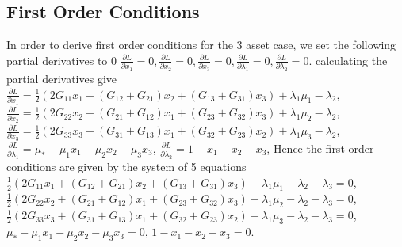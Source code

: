 \documentclass[11pt]{article}
\begin{document}
\subsection{First Order Conditions}
In order to derive first order conditions for the 3 asset case, we set the following partial derivatives to 0
\newline $\frac{\partial L}{\partial x_{1}}=0,  \frac{\partial L}{\partial x_{2}}=0, \frac{\partial L}{\partial x_{3}}=0, \frac{\partial L}{\partial \lambda_{1}}=0 , \frac{\partial L}{\partial \lambda_{2}}=0$.
\newline calculating the partial derivatives give
\newline  $\frac{\partial L}{\partial x_{1}}=\frac{1}{2}\left(2G_{11}x_1+\left(G_{12}+G_{21}\right)x_{2}+\left(G_{13}+G_{31}\right)x_{3}\right)+\lambda_1\mu_1-\lambda_2$,
\newline  $\frac{\partial L}{\partial x_{2}}=\frac{1}{2}\left(2G_{22}x_2+\left(G_{21}+G_{12}\right)x_{1}+\left(G_{23}+G_{32}\right)x_{3}\right)+\lambda_1\mu_2-\lambda_2$,
\newline  $\frac{\partial L}{\partial x_{3}}=\frac{1}{2}\left(2G_{33}x_3+\left(G_{31}+G_{13}\right)x_{1}+\left(G_{32}+G_{23}\right)x_{2}\right)+\lambda_1\mu_3-\lambda_2$,
\newline  $\frac{\partial L}{\partial \lambda_{1}}=\mu_{*}-\mu_{1}x_{1}-\mu_{2}x_{2}-\mu_3x_3 $,
\newline $\frac{\partial L}{\partial \lambda_{2}}=1-x_1-x_2-x_3$,
\newline Hence the first order conditions are given by the system of 5 equations
\newline $\frac{1}{2}\left(2G_{11}x_1+\left(G_{12}+G_{21}\right)x_{2}+\left(G_{13}+G_{31}\right)x_{3}\right)+\lambda_1\mu_1-\lambda_2-\lambda_3=0$,
\newline $\frac{1}{2}\left(2G_{22}x_2+\left(G_{21}+G_{12}\right)x_{1}+\left(G_{23}+G_{32}\right)x_{3}\right)+\lambda_1\mu_2-\lambda_2-\lambda_3=0$,
\newline $\frac{1}{2}\left(2G_{33}x_3+\left(G_{31}+G_{13}\right)x_{1}+\left(G_{32}+G_{23}\right)x_{2}\right)+\lambda_1\mu_3-\lambda_2-\lambda_3=0$,
\newline $\mu_{*}-\mu_{1}x_{1}-\mu_{2}x_{2}-\mu_3x_3=0$,
\newline $1-x_1-x_2-x_3=0$.
\end{document}
